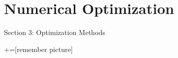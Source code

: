 %
% 
%
%
%
%
%




%
\section{Numerical Optimization } 
\begin{frame}
\huge{\centerline{Section 3: Optimization Methods}}
\end{frame}

\begin{comment}
:Title: Beamer arrows
:Tags: Remember picture, Beamer, Physics & chemistry, Overlays
:Use page: 3

With PGF/TikZ version 1.09 and later, it is possible to draw paths between nodes across
different pictures. This is a useful feature for presentations with the
Beamer package. In this example I've combined the new PGF/TikZ's overlay feature
with Beamer overlays. Download the PDF version to see the result.

**Note.** This only works with PDFTeX, and you have to run PDFTeX twice.

| Author: Kjell Magne Fauske

\end{comment}


+=[remember picture]

